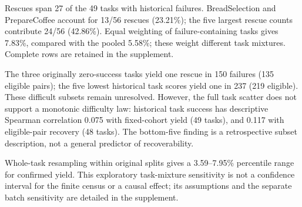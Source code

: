 Rescues span 27 of the 49 tasks with historical failures. BreadSelection and PrepareCoffee account for 13/56 rescues (23.21\%); the five largest rescue counts contribute 24/56 (42.86\%). Equal weighting of failure-containing tasks gives 7.83\%, compared with the pooled 5.58\%; these weight different task mixtures. Complete rows are retained in the supplement.

The three originally zero-success tasks yield one rescue in 150 failures (135 eligible pairs); the five lowest historical task scores yield one in 237 (219 eligible). These difficult subsets remain unresolved. However, the full task scatter does not support a monotonic difficulty law: historical task success has descriptive Spearman correlation 0.075 with fixed-cohort yield (49 tasks), and 0.117 with eligible-pair recovery (48 tasks). The bottom-five finding is a retrospective subset description, not a general predictor of recoverability.

Whole-task resampling within original splits gives a 3.59--7.95\% percentile range for confirmed yield. This exploratory task-mixture sensitivity is not a confidence interval for the finite census or a causal effect; its assumptions and the separate batch sensitivity are detailed in the supplement.
